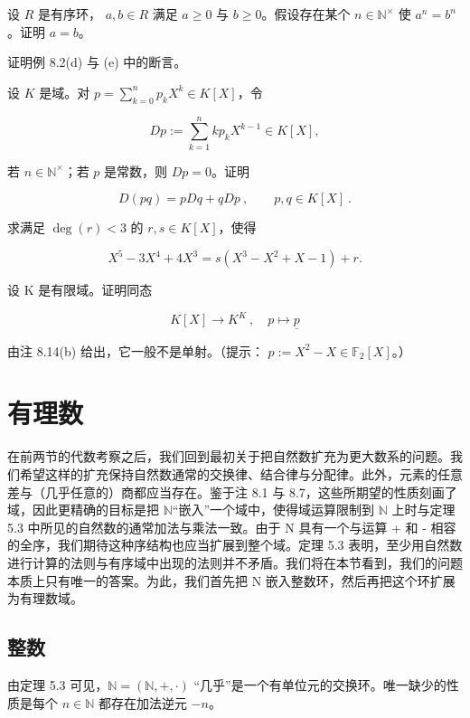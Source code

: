 \begin{exercises}
设  $ R $ 是有序环， $ a, b \in R $ 满足  $ a \geq 0 $ 与  $ b \geq 0 $。假设存在某个  $ n \in \mathbb{N}^\times $ 使  $ a^n = b^n $。证明  $ a = b $。

\item

证明例 8.2(d) 与 (e) 中的断言。

\item

设  $ K $ 是域。对  $ p = \sum_{k=0}^{n} p_k X^k \in K[X] $，令

\[
D p:=\sum_{k=1}^{n}k p_{k}X^{k-1}\in K[X],
\]

若  $ n \in \mathbb{N}^\times $；若  $ p $ 是常数，则  $ Dp = 0 $。证明

\[
D(p q)=p D q+q D p~,\qquad p,q\in K[X]~.
\]
\item

求满足  $ \deg(r) < 3 $ 的  $ r, s \in K[X] $，使得

\[
X^{5}-3X^{4}+4X^{3}=s(X^{3}-X^{2}+X-1)+r.
\]
\item

设 K 是有限域。证明同态

\[
K[X]\to K^{K}~,\quad p\mapsto\underline{p}
\]

由注 8.14(b) 给出，它一般不是单射。（提示： $ p := X^2 - X \in \mathbb{F}_2[X] $。）

\end{exercises}

\section{有理数}

在前两节的代数考察之后，我们回到最初关于把自然数扩充为更大数系的问题。我们希望这样的扩充保持自然数通常的交换律、结合律与分配律。此外，元素的任意差与（几乎任意的）商都应当存在。鉴于注 8.1 与 8.7，这些所期望的性质刻画了域，因此更精确的目标是把 $ \mathbb{N} $“嵌入”一个域中，使得域运算限制到 $ \mathbb{N} $ 上时与定理 5.3 中所见的自然数的通常加法与乘法一致。由于 N 具有一个与运算 + 和 - 相容的全序，我们期待这种序结构也应当扩展到整个域。定理 5.3 表明，至少用自然数进行计算的法则与有序域中出现的法则并不矛盾。我们将在本节看到，我们的问题本质上只有唯一的答案。为此，我们首先把 N 嵌入整数环，然后再把这个环扩展为有理数域。

\subsection*{整数}

由定理 5.3 可见，$ \mathbb{N} = (\mathbb{N}, +, \cdot) $ “几乎”是一个有单位元的交换环。唯一缺少的性质是每个 $ n \in \mathbb{N} $ 都存在加法逆元 $ -n $。

